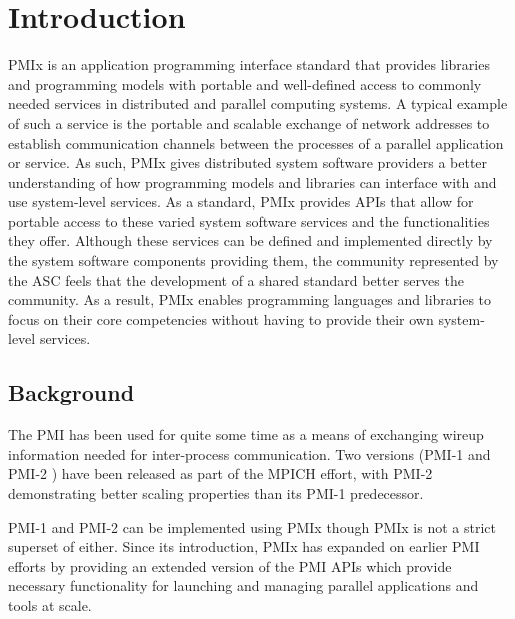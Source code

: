 \chapter{Introduction}
\label{chap:intro}

\ac{PMIx} is an application programming interface standard that provides
libraries and programming models with portable and well-defined access to commonly
needed services in distributed and parallel computing systems.
A typical example of such a service is the portable and scalable exchange of network
addresses to establish communication channels between the processes of a parallel
application or service.
As such, \ac{PMIx} gives distributed system software providers a better understanding of how
programming models and libraries can interface with and use system-level services.
As a standard, \ac{PMIx} provides \acp{API} that allow for
portable access to these varied system software services and the
functionalities they offer.  Although these services can be defined and implemented directly by the
system software components providing them, the
community represented by the \ac{ASC}
feels that the development of a shared standard better serves the
community.
As a result, \ac{PMIx} enables programming languages and libraries to focus on their core
competencies without having to provide their own system-level services.

\section{Background}
\label{chap:introduction:background}

The \ac{PMI} has been used for quite some time as a means of exchanging wireup information needed for inter-process communication.
Two versions (PMI-1 and PMI-2 \cite{2010-Balaji-EuroMPI}) have been released as part of the MPICH effort, with PMI-2 demonstrating better scaling properties than its PMI-1 predecessor.

PMI-1 and PMI-2 can be implemented using \ac{PMIx} though \ac{PMIx} is not a strict superset of either.
Since its introduction, \ac{PMIx} has expanded
on earlier \ac{PMI} efforts by
providing an extended version of the \ac{PMI} \acp{API} which provide necessary functionality for launching and managing parallel applications and tools at scale.


